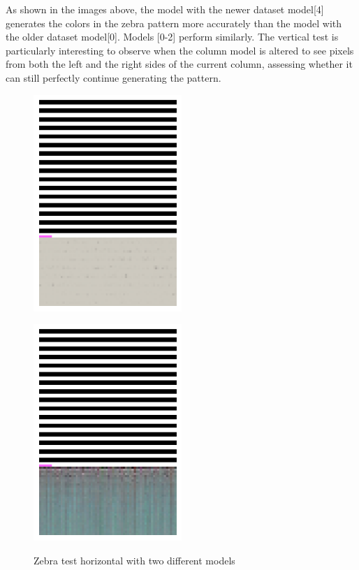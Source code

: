 \begin{itemize}
        As shown in the images above, the model with the newer dataset model[4] generates the colors in the zebra pattern more accurately than the model with the older dataset model[0]. Models [0-2] perform similarly. The vertical test is particularly interesting to observe when the column model is altered to see pixels from both the left and the right sides of the current column, assessing whether it can still perfectly continue generating the pattern.


        \begin{figure}[H]
            \centering
            \begin{minipage}{0.45\textwidth}
                \centering
                \includegraphics[width=0.5\textwidth]{imgs/ZebraTestH_2.1.7.1_OldData.png} 
                \label{fig:test2_1_M0_Cit}
            \end{minipage}
            \hfill
            \begin{minipage}{0.45\textwidth}
                \centering
                \includegraphics[width=0.5\textwidth]{imgs/ZebraTestH_2.1.8.1_512.png} 
                \label{fig:test2_1_M5_Cit}
            \end{minipage}
            \caption{Zebra test horizontal with two different models}
        \end{figure}


\end{itemize}
